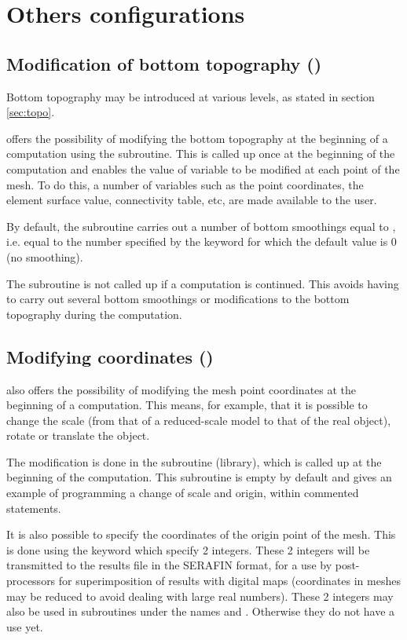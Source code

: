 \chapter{Others configurations}

\section{Modification of bottom topography ()}

Bottom topography may be introduced at various levels, as stated in section
\ref{sec:topo}.

 offers the possibility of modifying the bottom topography at the
beginning of a computation using the  subroutine. This is
called up once at the beginning of the computation and enables the value of
variable  to be modified at each point of the mesh. To do this, a number of
variables such as the point coordinates, the element surface value,
connectivity table, etc, are made available to the user.

By default, the  subroutine carries out a number of bottom
smoothings equal to , i.e. equal to the number specified by the keyword
 for which the default value is 0 (no
smoothing).

The  subroutine is not called up if a computation is continued.
This avoids having to carry out several bottom smoothings or modifications to
the bottom topography during the computation.


\section{Modifying coordinates ()}

 also offers the possibility of modifying the mesh point coordinates
at the beginning of a computation. This means, for example, that it is possible
to change the scale (from that of a reduced-scale model to that of the real
object), rotate or translate the object.

The modification is done in the  subroutine (\bief library), which
is called up at the beginning of the computation. This subroutine is empty by
default and gives an example of programming a change of scale and origin,
within commented statements.

It is also possible to specify the coordinates of the origin point of the mesh.
This is done using the keyword  which specify 2
integers. These 2 integers will be transmitted to the results file in the
SERAFIN format, for a use by post-processors for superimposition of results
with digital maps (coordinates in meshes may be reduced to avoid dealing with
large real numbers). These 2 integers may also be used in subroutines under the
names  and . Otherwise they do not have a use yet.


